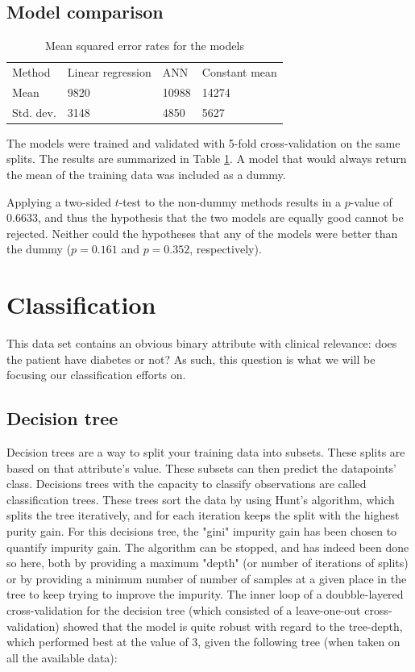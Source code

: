 \subsection{Model comparison}
\begin{table}[h]
\centering
\caption{Mean squared error rates for the models}
\label{error-rates}
\begin{tabular}{l|lll}
  Method & Linear regression & ANN & Constant mean\\
  Mean & 9820 & 10988 & 14274\\
  Std. dev. & 3148 & 4850 & 5627\\
\end{tabular}
\end{table}

The models were trained and validated with 5-fold cross-validation on the same splits.
The results are summarized in Table \ref{error-rates}.
A model that would always return the mean of the training data was included as a dummy.

Applying a two-sided $t$-test to the non-dummy methods
results in a $p$-value of $0.6633$,
and thus the hypothesis that the two models are equally good cannot be rejected.
Neither could the hypotheses that any of the models were better than the dummy
($p = 0.161$ and $p = 0.352$, respectively).



\section{Classification}

This data set contains an obvious binary attribute
with clinical relevance:
does the patient have diabetes or not?
As such, this question is what we will be
focusing our classification efforts on.

\subsection{Decision tree}
Decision trees are a way to split your training data into subsets. These splits are based on that attribute's value.
These subsets can then predict the datapoints' class. Decisions trees with the capacity to classify observations are called
classification trees. These trees sort the data by using Hunt's algorithm, which
splits the tree iteratively, and for each iteration keeps the split with the
highest purity gain. For this decisions tree, the "gini" impurity gain has been
chosen to quantify impurity gain. The algorithm can be stopped, and has indeed
been done so here, both by providing a maximum "depth" (or number of iterations
of splits) or by providing a minimum number of number of samples at a given
place in the tree to keep trying to improve the impurity.
The inner loop of a doubble-layered cross-validation for the decision tree
(which consisted of a leave-one-out cross-validation) showed
that the model is quite robust with regard to the tree-depth, which performed
best at the value of 3, given the following tree (when taken on all the available
data):

